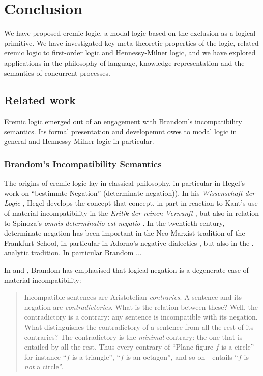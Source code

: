 \section{Conclusion}\label{conclusion}

\NI We have proposed eremic logic, a modal logic based on the
exclusion as a logical primitive. We have investigated key
meta-theoretic properties of the logic, related eremic logic to
first-order logic and Hennessy-Milner logic, and we have explored
applications in the philosophy of language, knowledge representation
and the semantics of concurrent processes.  

\subsection{Related work} 

Eremic logic emerged out of an engagement with Brandom's
incompatibility semantics.  Its formal presentation and developemnt
owes to modal logic in general and Hennessy-Milner logic in
particular.

\subsubsection{Brandom's Incompatibility Semantics}

The origins of eremic logic lay in classical philosophy, in particular
in Hegel's work on ``bestimmte Negation'' (determinate negation)).  In
his \emph{Wissenschaft der Logic} \cite{HegelGWF:wisdlog}, Hegel
develops the concept that concept, in part in reaction to Kant's use
of material incompatibility in the \emph{Kritik der reinen Vernunft}
\cite{KantI:kdrv}, but also in relation to Spinoza's \emph{omnis
  determinatio est negatio} \cite{???}.  In the twentieth century,
determinate negation has been important in the Neo-Marxist tradition
of the Frankfurt School, in particular in Adorno's negative dialectics
\cite{AdornoTW:negdia}, but also in the .
 analytic tradition. In particular Brandom ...


In \cite{brandom2} and \cite{brandom}, Brandom has emphasised that
logical negation is a degenerate case of material incompatibility:

\begin{quote}
Incompatible sentences are Aristotelian \emph{contraries}. A sentence
and its negation are \emph{contradictories}. What is the relation
between these? Well, the contradictory is a contrary: any sentence is
incompatible with its negation. What distinguishes the contradictory
of a sentence from all the rest of its contraries? The contradictory
is the \emph{minimal} contrary: the one that is entailed by all the
rest. Thus every contrary of ``Plane figure $f$ is a circle'' - for
instance ``$f$ is a triangle'', ``$f$ is an octagon'', and so on -
entails ``$f$ is \emph{not} a circle''.
\end{quote}


